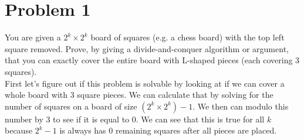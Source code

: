 \documentclass[12pt,letterpaper]{article}
\begin{document}
\pagebreak

\section*{Problem 1}
You are given a $2^k\times2^k$ board of squares (e.g. a chess board) with the top left square removed.
Prove, by giving a divide-and-conquer algorithm or argument, that you can exactly cover the
entire board with L-shaped pieces (each covering 3 squares).
\\[22pt]
First let's figure out if this problem is solvable by looking at if we 
can cover a whole board with 3 square pieces. We can calculate that by 
solving for the number of squares on a board of size $(2^k\times2^k) - 1$.
We then can modulo this number by 3 to see if it is equal to 0. We can
see that this is true for all $k$ because $2^k-1$ is always has 0 remaining
squares after all pieces are placed. 
\end{document}

